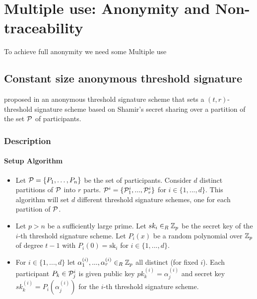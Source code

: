 \chapter{Multiple use: Anonymity and Non-traceability}
To achieve full anonymity we need some 
Multiple use 


\section{Constant size anonymous threshold signature}
\citeauthor*{DazaDSV09} proposed in \cite{DazaDSV09} an anonymous threshold signature scheme that sets a $(t,r)$-threshold signature scheme based on Shamir's secret sharing over a partition of the set ${\mathcal P}$ of participants.

\subsection{Description}
\subsubsection*{Setup Algorithm}
\begin{itemize}[align = left, leftmargin=*, label={--}]
\item Let ${\mathcal P} = \{P_1 , \dots , P_n \}$ be the set of participants. Consider $d$ distinct partitions of ${\mathcal P}$ into $r$ parts.
${\mathcal P}^i = \{{\mathcal P}^i_1, ... , {\mathcal P}^i_r\}$ for $i \in \{1, ... , d\}$. This algorithm will set $d$ different threshold signature schemes, one for each partition of ${\mathcal P}$.

\item Let $p > n$ be a sufficiently large prime. Let $sk_i \in_R {\mathbb Z}_p$ be the secret key of the $i$-th threshold signature scheme. Let $P_i(x)$ be a random polynomial over ${\mathbb Z}_p$ of degree $t-1$ with ${P_i(0) = \mbox{sk}_i}$ for $i \in \{1, ..., d\}$.

\item For $i \in \{1, ..., d\}$ let $\alpha^{(i)}_1, ... , \alpha^{(i)}_r \in_R {\mathbb Z}_p$ all distinct (for fixed $i$). Each participant $P_k \in {\mathcal P}^i_j$ is given public key $pk^{(i)}_k = \alpha^{(i)}_j$ and secret key $sk^{(i)}_k = P_i(\alpha^{(i)}_j)$ for the $i$-th threshold signature scheme. 
\end{itemize}

